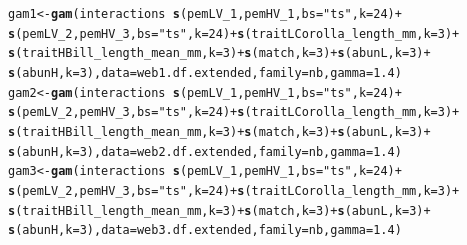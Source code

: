 \documentclass[a4paper, 11pt]{article}\usepackage[]{graphicx}\usepackage[]{color}
\makeatletter
\newcommand{\hlnum}[1]{\textcolor[rgb]{0.686,0.059,0.569}{#1}}%
\newcommand{\hlstr}[1]{\textcolor[rgb]{0.192,0.494,0.8}{#1}}%
\newcommand{\hlopt}[1]{\textcolor[rgb]{0,0,0}{#1}}%
\newcommand{\hlstd}[1]{\textcolor[rgb]{0.345,0.345,0.345}{#1}}%
\newcommand{\hlkwb}[1]{\textcolor[rgb]{0.69,0.353,0.396}{#1}}%
\newcommand{\hlkwc}[1]{\textcolor[rgb]{0.333,0.667,0.333}{#1}}%
\newcommand{\hlkwd}[1]{\textcolor[rgb]{0.737,0.353,0.396}{\textbf{#1}}}%
\newenvironment{kframe}{%
 \def\at@end@of@kframe{}%
 \ifinner\ifhmode%
  \def\at@end@of@kframe{\end{minipage}}%
  \begin{minipage}{\columnwidth}%
 \fi\fi%
 \def\FrameCommand##1{\hskip\@totalleftmargin \hskip-\fboxsep
 \colorbox{shadecolor}{##1}\hskip-\fboxsep
     \hskip-\linewidth \hskip-\@totalleftmargin \hskip\columnwidth}%
 \MakeFramed {\advance\hsize-\width
   \@totalleftmargin\z@ \linewidth\hsize
   \@setminipage}}%
 {\par\unskip\endMakeFramed%
 \at@end@of@kframe}
\newenvironment{knitrout}{}{} %
\makeatother
\begin{document}
\begin{knitrout}\small
{}\color{fgcolor}\begin{kframe}
\begin{alltt}
\hlstd{gam1} \hlkwb{<-} \hlkwd{gam}\hlstd{(interactions} \hlopt{~} \hlkwd{s}\hlstd{(pemLV_1, pemHV_1,} \hlkwc{bs}\hlstd{=}\hlstr{"ts"}\hlstd{,} \hlkwc{k}\hlstd{=}\hlnum{24}\hlstd{)} \hlopt{+}
  \hlkwd{s}\hlstd{(pemLV_2, pemHV_3,} \hlkwc{bs}\hlstd{=}\hlstr{"ts"}\hlstd{,} \hlkwc{k}\hlstd{=}\hlnum{24}\hlstd{)} \hlopt{+} \hlkwd{s}\hlstd{(traitLCorolla_length_mm,} \hlkwc{k}\hlstd{=}\hlnum{3}\hlstd{)} \hlopt{+}
  \hlkwd{s}\hlstd{(traitHBill_length_mean_mm,} \hlkwc{k}\hlstd{=}\hlnum{3}\hlstd{)} \hlopt{+} \hlkwd{s}\hlstd{(match,} \hlkwc{k}\hlstd{=}\hlnum{3}\hlstd{)} \hlopt{+} \hlkwd{s}\hlstd{(abunL,} \hlkwc{k}\hlstd{=}\hlnum{3}\hlstd{)} \hlopt{+}
    \hlkwd{s}\hlstd{(abunH,} \hlkwc{k}\hlstd{=}\hlnum{3}\hlstd{),} \hlkwc{data}\hlstd{=web1.df.extended,} \hlkwc{family}\hlstd{=nb,} \hlkwc{gamma}\hlstd{=}\hlnum{1.4}\hlstd{)}
\hlstd{gam2} \hlkwb{<-} \hlkwd{gam}\hlstd{(interactions} \hlopt{~} \hlkwd{s}\hlstd{(pemLV_1, pemHV_1,} \hlkwc{bs}\hlstd{=}\hlstr{"ts"}\hlstd{,} \hlkwc{k}\hlstd{=}\hlnum{24}\hlstd{)} \hlopt{+}
  \hlkwd{s}\hlstd{(pemLV_2, pemHV_3,} \hlkwc{bs}\hlstd{=}\hlstr{"ts"}\hlstd{,} \hlkwc{k}\hlstd{=}\hlnum{24}\hlstd{)} \hlopt{+} \hlkwd{s}\hlstd{(traitLCorolla_length_mm,} \hlkwc{k}\hlstd{=}\hlnum{3}\hlstd{)} \hlopt{+}
  \hlkwd{s}\hlstd{(traitHBill_length_mean_mm,} \hlkwc{k}\hlstd{=}\hlnum{3}\hlstd{)} \hlopt{+} \hlkwd{s}\hlstd{(match,} \hlkwc{k}\hlstd{=}\hlnum{3}\hlstd{)} \hlopt{+} \hlkwd{s}\hlstd{(abunL,} \hlkwc{k}\hlstd{=}\hlnum{3}\hlstd{)} \hlopt{+}
  \hlkwd{s}\hlstd{(abunH,} \hlkwc{k}\hlstd{=}\hlnum{3}\hlstd{),} \hlkwc{data}\hlstd{=web2.df.extended,} \hlkwc{family}\hlstd{=nb,} \hlkwc{gamma}\hlstd{=}\hlnum{1.4}\hlstd{)}
\hlstd{gam3} \hlkwb{<-} \hlkwd{gam}\hlstd{(interactions} \hlopt{~} \hlkwd{s}\hlstd{(pemLV_1, pemHV_1,} \hlkwc{bs}\hlstd{=}\hlstr{"ts"}\hlstd{,} \hlkwc{k}\hlstd{=}\hlnum{24}\hlstd{)} \hlopt{+}
  \hlkwd{s}\hlstd{(pemLV_2, pemHV_3,} \hlkwc{bs}\hlstd{=}\hlstr{"ts"}\hlstd{,} \hlkwc{k}\hlstd{=}\hlnum{24}\hlstd{)} \hlopt{+} \hlkwd{s}\hlstd{(traitLCorolla_length_mm,} \hlkwc{k}\hlstd{=}\hlnum{3}\hlstd{)} \hlopt{+}
  \hlkwd{s}\hlstd{(traitHBill_length_mean_mm,} \hlkwc{k}\hlstd{=}\hlnum{3}\hlstd{)} \hlopt{+} \hlkwd{s}\hlstd{(match,} \hlkwc{k}\hlstd{=}\hlnum{3}\hlstd{)} \hlopt{+} \hlkwd{s}\hlstd{(abunL,} \hlkwc{k}\hlstd{=}\hlnum{3}\hlstd{)} \hlopt{+}
  \hlkwd{s}\hlstd{(abunH,} \hlkwc{k}\hlstd{=}\hlnum{3}\hlstd{),} \hlkwc{data}\hlstd{=web3.df.extended,} \hlkwc{family}\hlstd{=nb,} \hlkwc{gamma}\hlstd{=}\hlnum{1.4}\hlstd{)}
\end{alltt}
\end{kframe}
\end{knitrout}
\end{document}
